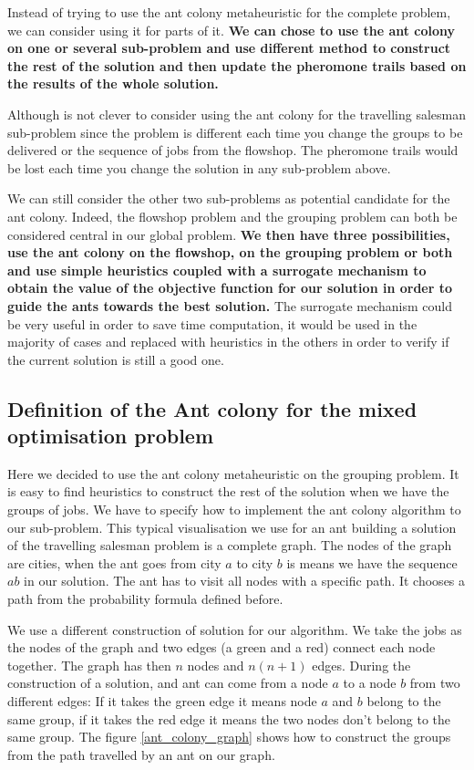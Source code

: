 \documentclass[UTF8, twoside]{EPURapport}
\begin{document}
	Instead of trying to use the ant colony metaheuristic for the complete problem, we can consider using it for parts of it. \textbf{We can chose to use the ant colony on one or several sub-problem and use different method to construct the rest of the solution and then update the pheromone trails based on the results of the whole solution.} 
	
	Although is not clever to consider using the ant colony for the travelling salesman sub-problem since the problem is different each time you change the groups to be delivered or the sequence of jobs from the flowshop. The pheromone trails would be lost each time you change the solution in any sub-problem above.
	
	We can still consider the other two sub-problems as potential candidate for the ant colony. Indeed, the flowshop problem and the grouping problem can both be considered central in our global problem. \textbf{We then have three possibilities, use the ant colony on the flowshop, on the grouping problem or both and use simple heuristics coupled with a surrogate mechanism to obtain the value of the objective function for our solution in order to guide the ants towards the best solution.} The surrogate mechanism could be very useful in order to save time computation, it would be used in the majority of cases and replaced with heuristics in the others in order to verify if the current solution is still a good one.
\\	

\subsection{Definition of the Ant colony for the mixed optimisation problem}
	
	Here we decided to use the ant colony metaheuristic on the grouping problem. It is easy to find heuristics to construct the rest of the solution when we have the groups of jobs. We have to specify how to implement the ant colony algorithm to our sub-problem. This typical visualisation we use for an ant building a solution of the travelling salesman problem is a complete graph. The nodes of the graph are cities, when the ant goes from city $a$ to city $b$ is means we have the sequence $ab$ in our solution. The ant has to visit all nodes with a specific path. It chooses a path from the probability formula defined before.
	
	We use a different construction of solution for our algorithm. We take the jobs as the nodes of the graph and two edges (a green and a red) connect each node together. The graph has then $n$ nodes and $n(n+1)$ edges. During the construction of a solution, and ant can come from a node $a$ to a node $b$ from two different edges: If it takes the green edge it means node $a$ and $b$ belong to the same group, if it takes the red edge it means the two nodes don't belong to the same group. The figure \ref{ant_colony_graph} shows how to construct the groups from the path travelled by an ant on our graph.
\\
\end{document}

